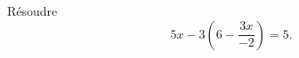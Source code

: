 
\begin{exercice}\label{exoSeconde-0013}

    Résoudre 
    \begin{equation}
        5x-3\left( 6-\frac{ 3x }{ -2 } \right)=5.
    \end{equation}

\end{exercice}
